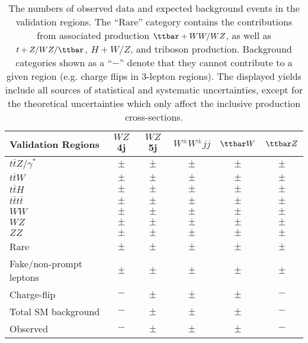 \begin{table}[t!]
\hspace{0.5cm}
\def\arraystretch{1.1}
\centering
\begin{tabular}{|l|c|c|c|c|c|}
\hline    
 Validation Regions       & $WZ$4j & $WZ$5j  & $W^\pm W^{\pm}jj$& $\ttbar W$   & $\ttbar Z$  \\
\hline\hline
$t\bar{t}Z/\gamma^*$     & $  \pm  $ & $  \pm  $      & $  \pm  $  & $  \pm  $    & $  \pm  $  \\
$t\bar{t}W$              & $  \pm $  & $  \pm  $      & $  \pm  $  & $  \pm  $    & $  \pm  $  \\
$t\bar{t}H$              & $  \pm $  & $  \pm  $      & $  \pm  $  & $  \pm  $    & $  \pm  $  \\
$t\bar{t}t\bar{t}$       & $  \pm $  & $  \pm  $      & $  \pm  $  & $  \pm  $    & $  \pm  $  \\
$WW$                     & $  \pm $  & $  \pm  $      & $  \pm  $  & $  \pm  $    & $  \pm  $  \\
$WZ$                     & $  \pm $  & $  \pm  $      & $  \pm  $  & $  \pm  $    & $  \pm  $  \\
$ZZ$                     & $  \pm $  & $  \pm  $      & $  \pm  $  & $  \pm  $    & $  \pm  $  \\
Rare                     & $  \pm  $ & $  \pm  $      & $  \pm  $  & $  \pm  $    & $  \pm  $  \\
Fake/non-prompt leptons  & $  \pm  $ & $  \pm  $      & $  \pm  $  & $  \pm  $    & $  \pm $  \\
Charge-flip              & $-$       & $  \pm  $      & $  \pm  $  & $  \pm  $    & $-$  \\
\hline
Total SM  background   	& $-$        & $  \pm  $      & $  \pm  $  & $  \pm  $    & $-$  \\
\hline
Observed	   	& $-$        & $  \pm  $      & $  \pm  $  & $  \pm  $    & $-$  \\
\hline
\end{tabular}
\caption{The numbers of observed data and expected background events in the validation regions. 
The ``Rare'' category contains the contributions from associated production $\ttbar+WW/WZ$, 
as well as $t+Z/WZ/\ttbar$, $H+W/Z$, and triboson production. Background categories shown as a ``$-$'' 
denote that they cannot contribute to a given region (e.g. charge flips in 3-lepton regions). 
The displayed yields include all sources of statistical and systematic uncertainties, 
except for the theoretical uncertainties which only affect the inclusive production cross-sections.}
\label{tab:VR_yields}
\end{table}


